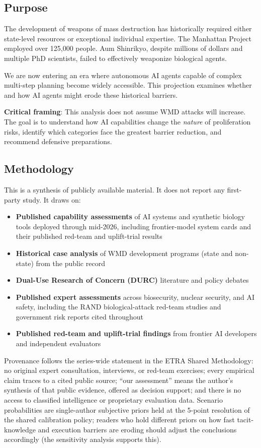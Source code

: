 \documentclass[11pt,letterpaper]{article}
\begin{document}
\subsection{Purpose}

The development of weapons of mass destruction has historically required either state-level resources or exceptional individual expertise. The Manhattan Project employed over 125,000 people. Aum Shinrikyo, despite millions of dollars and multiple PhD scientists, failed to effectively weaponize biological agents.

We are now entering an era where autonomous AI agents capable of complex multi-step planning become widely accessible. This projection examines whether and how AI agents might erode these historical barriers.

\textbf{Critical framing}: This analysis does not assume WMD attacks will increase. The goal is to understand how AI capabilities change the \textit{nature} of proliferation risks, identify which categories face the greatest barrier reduction, and recommend defensive preparations.

\subsection{Methodology}

This is a synthesis of publicly available material. It does not report any first-party study. It draws on:
\begin{itemize}
  \item \textbf{Published capability assessments} of AI systems and synthetic biology tools deployed through mid-2026, including frontier-model system cards and their published red-team and uplift-trial results
  \item \textbf{Historical case analysis} of WMD development programs (state and non-state) from the public record
  \item \textbf{Dual-Use Research of Concern (DURC)} literature and policy debates
  \item \textbf{Published expert assessments} across biosecurity, nuclear security, and AI safety, including the RAND biological-attack red-team studies and government risk reports cited throughout
  \item \textbf{Published red-team and uplift-trial findings} from frontier AI developers and independent evaluators
\end{itemize}

Provenance follows the series-wide statement in the ETRA Shared Methodology: no original expert consultation, interviews, or red-team exercises; every empirical claim traces to a cited public source; ``our assessment'' means the author's synthesis of that public evidence, offered as decision support; and there is no access to classified intelligence or proprietary evaluation data. Scenario probabilities are single-author subjective priors held at the 5-point resolution of the shared calibration policy; readers who hold different priors on how fast tacit-knowledge and execution barriers are eroding should adjust the conclusions accordingly (the sensitivity analysis supports this).
\end{document}
